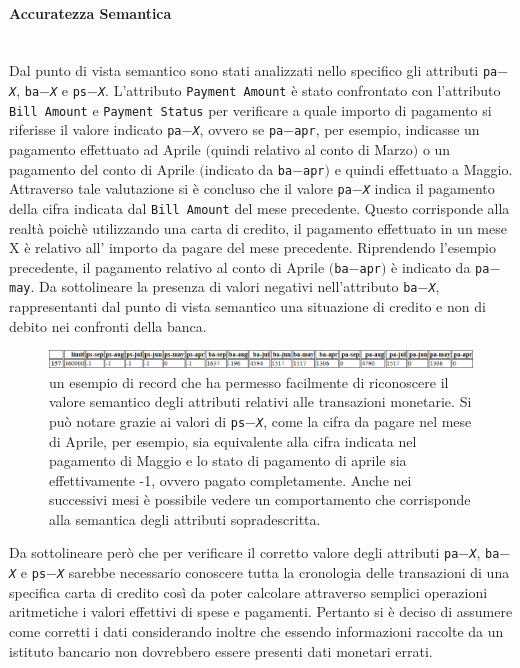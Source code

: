 \paragraph{Accuratezza Semantica}\mbox{}\\
Dal punto di vista semantico sono stati analizzati nello specifico gli attributi \texttt{pa$-$\textit{X}}, \texttt{ba$-$\textit{X}} e \texttt{ps$-$\textit{X}}.
L’attributo \texttt{Payment Amount} è stato confrontato con l’attributo \texttt{Bill Amount} e \texttt{Payment Status} per verificare a quale importo di pagamento si riferisse il valore indicato \texttt{pa$-$\textit{X}}, ovvero se \texttt{pa$-$apr}, per esempio, indicasse un pagamento effettuato ad Aprile $($quindi relativo al conto di Marzo$)$ o un pagamento del conto di Aprile $($indicato da \texttt{ba$-$apr}$)$ e quindi effettuato a Maggio. Attraverso tale valutazione si è concluso che il valore  \texttt{pa$-$\textit{X}} indica il pagamento della cifra indicata dal \texttt{Bill Amount} del mese precedente. Questo corrisponde alla realtà poichè utilizzando una carta di credito, il pagamento effettuato in un mese X è relativo all’ importo da pagare del mese precedente. Riprendendo l’esempio precedente, il pagamento relativo al conto di Aprile $($\texttt{ba$-$apr}$)$ è indicato da \texttt{pa$-$may}. 
Da sottolineare la presenza di valori negativi nell’attributo \texttt{ba$-$\textit{X}}, rappresentanti dal punto di vista semantico una situazione di credito e non di debito nei confronti della banca.
\\
\begin{figure}[H]
	\centering
	\includegraphics[width=\linewidth]{img/record-example.png}
	\caption[LOF entry]{un esempio di record che ha permesso facilmente di riconoscere il valore semantico degli attributi relativi alle transazioni monetarie. Si può notare grazie ai valori di \texttt{ps$-$\textit{X}}, come la cifra da pagare nel mese di Aprile, per esempio, sia equivalente alla cifra indicata nel pagamento di Maggio e lo stato di pagamento di aprile sia effettivamente -1, ovvero pagato completamente. Anche nei successivi mesi è possibile vedere un comportamento che corrisponde alla semantica degli attributi sopradescritta.}
	\label{record}
\end{figure}

Da sottolineare però che per verificare il corretto valore degli attributi  \texttt{pa$-$\textit{X}}, \texttt{ba$-$\textit{X}} e \texttt{ps$-$\textit{X}} sarebbe necessario conoscere tutta la cronologia delle transazioni di una specifica carta di credito così da poter calcolare attraverso semplici operazioni aritmetiche i valori effettivi di spese e pagamenti. Pertanto si è deciso di assumere come corretti i dati considerando inoltre che essendo informazioni raccolte da un istituto bancario non dovrebbero essere presenti dati monetari errati. 
\mbox{}\\
\mbox{}\\
